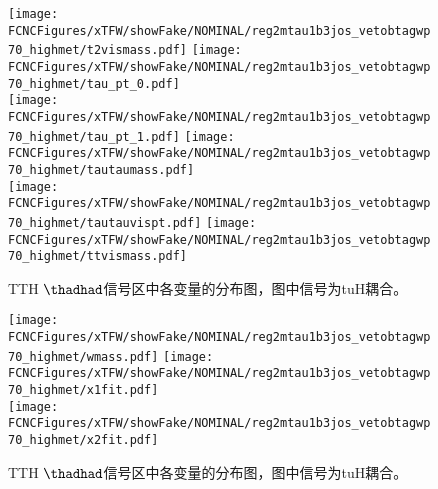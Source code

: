 \begin{figure}[H]
\centering
\texttt{[image: \\FCNCFigures/xTFW/showFake/NOMINAL/reg2mtau1b3jos\_vetobtagwp70\_highmet/t2vismass.pdf]}
\texttt{[image: \\FCNCFigures/xTFW/showFake/NOMINAL/reg2mtau1b3jos\_vetobtagwp70\_highmet/tau\_pt\_0.pdf]}
\\
\texttt{[image: \\FCNCFigures/xTFW/showFake/NOMINAL/reg2mtau1b3jos\_vetobtagwp70\_highmet/tau\_pt\_1.pdf]}
\texttt{[image: \\FCNCFigures/xTFW/showFake/NOMINAL/reg2mtau1b3jos\_vetobtagwp70\_highmet/tautaumass.pdf]}
\\
\texttt{[image: \\FCNCFigures/xTFW/showFake/NOMINAL/reg2mtau1b3jos\_vetobtagwp70\_highmet/tautauvispt.pdf]}
\texttt{[image: \\FCNCFigures/xTFW/showFake/NOMINAL/reg2mtau1b3jos\_vetobtagwp70\_highmet/ttvismass.pdf]}
\\
\caption{TTH $\thadhad$信号区中各变量的分布图，图中信号为tuH耦合。}
\label{fig:var_reg2mtau1b3jos_vetobtagwp70_highmet_3}
\end{figure}
\begin{figure}[H]
\centering
\texttt{[image: \\FCNCFigures/xTFW/showFake/NOMINAL/reg2mtau1b3jos\_vetobtagwp70\_highmet/wmass.pdf]}
\texttt{[image: \\FCNCFigures/xTFW/showFake/NOMINAL/reg2mtau1b3jos\_vetobtagwp70\_highmet/x1fit.pdf]}
\\
\texttt{[image: \\FCNCFigures/xTFW/showFake/NOMINAL/reg2mtau1b3jos\_vetobtagwp70\_highmet/x2fit.pdf]}
\caption{TTH $\thadhad$信号区中各变量的分布图，图中信号为tuH耦合。}
\label{fig:var_reg2mtau1b3jos_vetobtagwp70_highmet}
\end{figure}

